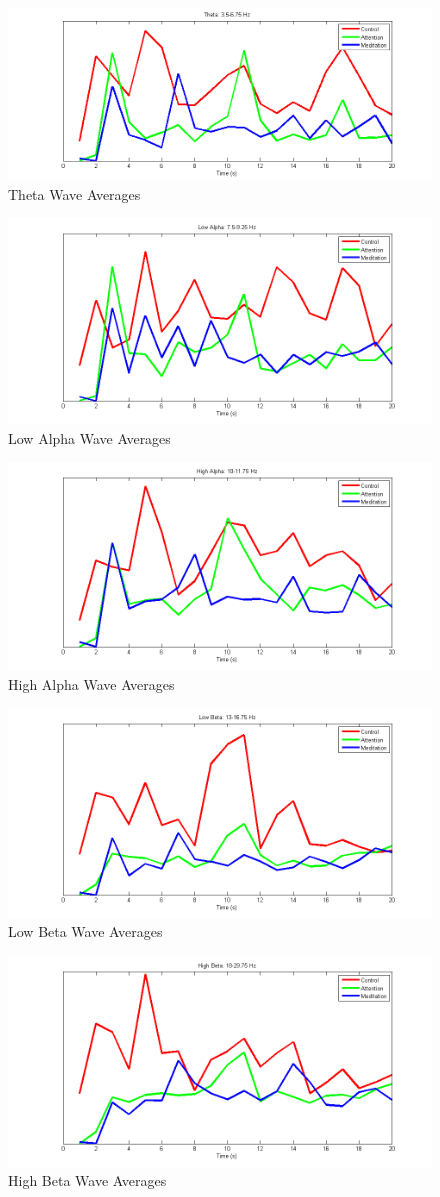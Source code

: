 \documentclass[journal]{IEEEtran}
\begin{document}
\begin{figure}[H]
    \centering
    \includegraphics[width=.5\textwidth]{EEG/wave2}
    \caption{Theta Wave Averages}
    \label{w2}
\end{figure}

\begin{figure}[H]
    \centering
    \includegraphics[width=.5\textwidth]{EEG/wave3}
    \caption{Low Alpha Wave Averages}
    \label{w3}
\end{figure}

\begin{figure}[H]
    \centering
    \includegraphics[width=.5\textwidth]{EEG/wave4}
    \caption{High Alpha Wave Averages}
    \label{w4}
\end{figure}

\begin{figure}[H]
    \centering
    \includegraphics[width=.5\textwidth]{EEG/wave5}
    \caption{Low Beta Wave Averages}
    \label{w5}
\end{figure}

\begin{figure}[H]
    \centering
    \includegraphics[width=.5\textwidth]{EEG/wave6}
    \caption{High Beta Wave Averages}
    \label{w6}
\end{figure}
\end{document}
